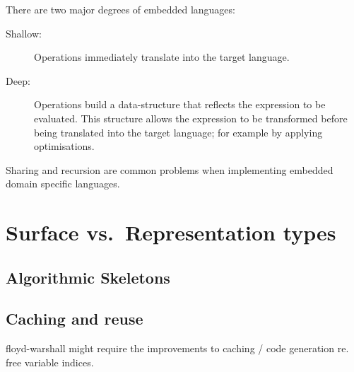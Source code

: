 There are two major degrees of embedded languages:

\begin{description}
\item[Shallow:] Operations immediately translate into the target language.

\item[Deep:] Operations build a data-structure that reflects the expression to
    be evaluated. This structure allows the expression to be transformed before
    being translated into the target language; for example by applying
    optimisations.
\end{description}

Sharing and recursion are common problems when implementing embedded domain
specific languages.

\section{Surface vs.\ Representation types}


\subsection{Algorithmic Skeletons}

\subsection{Caching and reuse}
floyd-warshall might require the improvements to caching / code generation re.
free variable indices.

